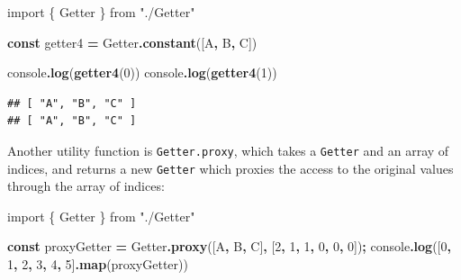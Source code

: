 \documentclass[
]{book}
\newenvironment{Shaded}{\begin{snugshade}}{\end{snugshade}}
\newcommand{\BuiltInTok}[1]{#1}
\newcommand{\DecValTok}[1]{\textcolor[rgb]{0.00,0.00,0.81}{#1}}
\newcommand{\FunctionTok}[1]{\textcolor[rgb]{0.13,0.29,0.53}{\textbf{#1}}}
\newcommand{\ImportTok}[1]{#1}
\newcommand{\KeywordTok}[1]{\textcolor[rgb]{0.13,0.29,0.53}{\textbf{#1}}}
\newcommand{\NormalTok}[1]{#1}
\newcommand{\OperatorTok}[1]{\textcolor[rgb]{0.81,0.36,0.00}{\textbf{#1}}}
\newcommand{\StringTok}[1]{\textcolor[rgb]{0.31,0.60,0.02}{#1}}
\newcommand{\VerbatimStringTok}[1]{\textcolor[rgb]{0.31,0.60,0.02}{#1}}
\theoremstyle{definition}
\theoremstyle{definition}
\theoremstyle{definition}
\theoremstyle{definition}
\theoremstyle{remark}
\begin{document}
\begin{Shaded}
\begin{Highlighting}[]
\ImportTok{import}\NormalTok{ \{ Getter \} }\ImportTok{from} \StringTok{"./Getter"}

\KeywordTok{const}\NormalTok{ getter4 }\OperatorTok{=}\NormalTok{ Getter}\OperatorTok{.}\FunctionTok{constant}\NormalTok{([}\VerbatimStringTok{\textasciigrave{}A\textasciigrave{}}\OperatorTok{,} \VerbatimStringTok{\textasciigrave{}B\textasciigrave{}}\OperatorTok{,} \VerbatimStringTok{\textasciigrave{}C\textasciigrave{}}\NormalTok{])}

\BuiltInTok{console}\OperatorTok{.}\FunctionTok{log}\NormalTok{(}\FunctionTok{getter4}\NormalTok{(}\DecValTok{0}\NormalTok{))}
\BuiltInTok{console}\OperatorTok{.}\FunctionTok{log}\NormalTok{(}\FunctionTok{getter4}\NormalTok{(}\DecValTok{1}\NormalTok{))}
\end{Highlighting}
\end{Shaded}

\begin{verbatim}
## [ "A", "B", "C" ]
## [ "A", "B", "C" ]
\end{verbatim}

Another utility function is \texttt{Getter.proxy}, which takes a \texttt{Getter} and an array of indices, and returns a new \texttt{Getter} which proxies the access to the original values through the array of indices:

\begin{Shaded}
\begin{Highlighting}[]
\ImportTok{import}\NormalTok{ \{ Getter \} }\ImportTok{from} \StringTok{"./Getter"}

\KeywordTok{const}\NormalTok{ proxyGetter }\OperatorTok{=}\NormalTok{ Getter}\OperatorTok{.}\FunctionTok{proxy}\NormalTok{([}\VerbatimStringTok{\textasciigrave{}A\textasciigrave{}}\OperatorTok{,} \VerbatimStringTok{\textasciigrave{}B\textasciigrave{}}\OperatorTok{,} \VerbatimStringTok{\textasciigrave{}C\textasciigrave{}}\NormalTok{]}\OperatorTok{,}\NormalTok{ [}\DecValTok{2}\OperatorTok{,} \DecValTok{1}\OperatorTok{,} \DecValTok{1}\OperatorTok{,} \DecValTok{0}\OperatorTok{,} \DecValTok{0}\OperatorTok{,} \DecValTok{0}\NormalTok{])}\OperatorTok{;}
\BuiltInTok{console}\OperatorTok{.}\FunctionTok{log}\NormalTok{([}\DecValTok{0}\OperatorTok{,} \DecValTok{1}\OperatorTok{,} \DecValTok{2}\OperatorTok{,} \DecValTok{3}\OperatorTok{,} \DecValTok{4}\OperatorTok{,} \DecValTok{5}\NormalTok{]}\OperatorTok{.}\FunctionTok{map}\NormalTok{(proxyGetter))}
\end{Highlighting}
\end{Shaded}
\end{document}
